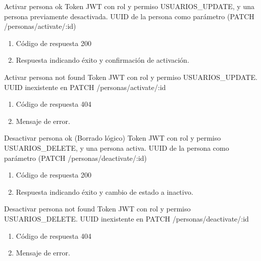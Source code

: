 {Activar persona ok}
{Token JWT con rol y permiso USUARIOS\_UPDATE, y una persona previamente desactivada.}
{UUID de la persona como parámetro (PATCH /personas/activate/:id)}
{\begin{enumerate} [leftmargin=*, nosep]
    \item Código de respuesta 200
    \item Respuesta indicando éxito y confirmación de activación.
\end{enumerate}}

{Activar persona not found}
{Token JWT con rol y permiso USUARIOS\_UPDATE.}
{UUID inexistente en PATCH /personas/activate/:id}
{\begin{enumerate} [leftmargin=*, nosep]
    \item Código de respuesta 404
    \item Mensaje de error.
\end{enumerate}}

{Desactivar persona ok (Borrado lógico)}
{Token JWT con rol y permiso USUARIOS\_DELETE, y una persona activa.}
{UUID de la persona como parámetro (PATCH /personas/deactivate/:id)}
{\begin{enumerate} [leftmargin=*, nosep]
    \item Código de respuesta 200
    \item Respuesta indicando éxito y cambio de estado a inactivo.
\end{enumerate}}

{Desactivar persona not found}
{Token JWT con rol y permiso USUARIOS\_DELETE.}
{UUID inexistente en PATCH /personas/deactivate/:id}
{\begin{enumerate} [leftmargin=*, nosep]
    \item Código de respuesta 404
    \item Mensaje de error.
\end{enumerate}}

